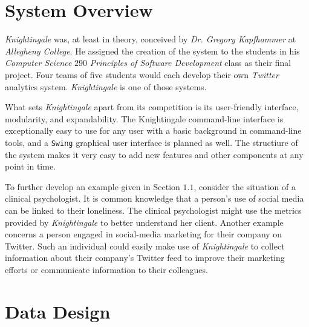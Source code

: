 \documentclass[a4paper, 12pt]{article}
\begin{document}
\section{System Overview} \label{sec:overview}
\begin{adjustwidth}{1em}{0pt}
\textit{Knightingale} was, at least in theory, conceived by \textit{Dr. Gregory Kapfhammer} at \textit{Allegheny College}. He assigned the creation of the system to the students in his \textit{Computer Science} $290$ \textit{Principles of Software Development} class as their final project. Four teams of five students would each develop their own \textit{Twitter} analytics system. \textit{Knightingale} is one of those systems. \newline

\noindent What sets \textit{Knightingale} apart from its competition is its user-friendly interface, modularity, and expandability. The Knightingale command-line interface is exceptionally easy to use for any user with a basic background in command-line tools, and a \texttt{Swing} graphical user interface is planned as well. The structiure of the system makes it very easy to add new features and other components at any point in time. \newline

\noindent To further develop an example given in Section $1.1$, consider the situation of a clinical psychologist. It is common knowledge that a person's use of social media can be linked to their loneliness. The clinical psychologist might use the metrics provided by \textit{Knightingale} to better understand her client. Another example concerns a person engaged in social-media marketing for their company on Twitter. Such an individual could easily make use of \textit{Knightingale} to collect information about their company's Twitter feed to improve their marketing efforts or communicate information to their colleagues.
\end{adjustwidth}
 
\section{Data Design} \label{sec:datadesign}
\end{document}
